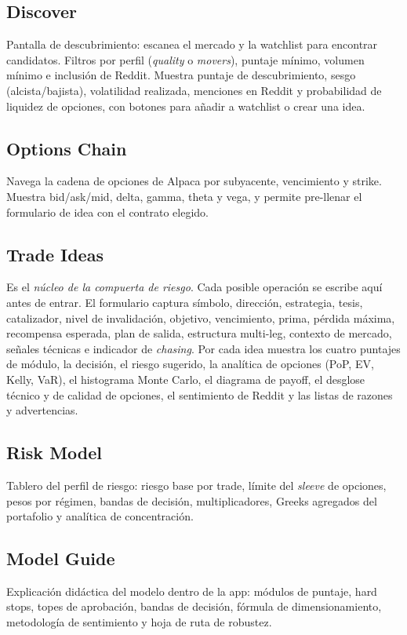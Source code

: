 \documentclass[11pt,letterpaper]{article}
\begin{document}
\subsection{Discover}
Pantalla de descubrimiento: escanea el mercado y la watchlist para encontrar
candidatos. Filtros por perfil (\emph{quality} o \emph{movers}), puntaje mínimo,
volumen mínimo e inclusión de Reddit. Muestra puntaje de descubrimiento, sesgo
(alcista/bajista), volatilidad realizada, menciones en Reddit y probabilidad de
liquidez de opciones, con botones para añadir a watchlist o crear una idea.

\subsection{Options Chain}
Navega la cadena de opciones de Alpaca por subyacente, vencimiento y strike.
Muestra bid/ask/mid, delta, gamma, theta y vega, y permite pre-llenar el
formulario de idea con el contrato elegido.

\subsection{Trade Ideas}
Es el \emph{núcleo de la compuerta de riesgo}. Cada posible operación se escribe
aquí antes de entrar. El formulario captura símbolo, dirección, estrategia,
tesis, catalizador, nivel de invalidación, objetivo, vencimiento, prima, pérdida
máxima, recompensa esperada, plan de salida, estructura multi-leg, contexto de
mercado, señales técnicas e indicador de \emph{chasing}. Por cada idea muestra
los cuatro puntajes de módulo, la decisión, el riesgo sugerido, la analítica de
opciones (PoP, EV, Kelly, VaR), el histograma Monte Carlo, el diagrama de payoff,
el desglose técnico y de calidad de opciones, el sentimiento de Reddit y las
listas de razones y advertencias.

\subsection{Risk Model}
Tablero del perfil de riesgo: riesgo base por trade, límite del \emph{sleeve} de
opciones, pesos por régimen, bandas de decisión, multiplicadores, Greeks
agregados del portafolio y analítica de concentración.

\subsection{Model Guide}
Explicación didáctica del modelo dentro de la app: módulos de puntaje, hard
stops, topes de aprobación, bandas de decisión, fórmula de dimensionamiento,
metodología de sentimiento y hoja de ruta de robustez.
\end{document}
